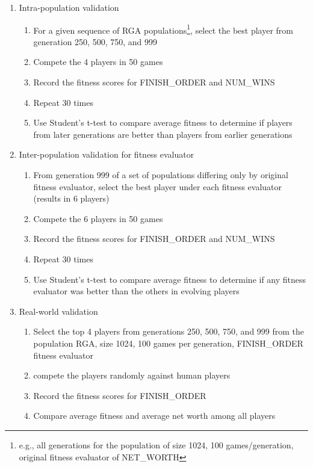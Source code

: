 \begin{enumerate} 
  \item {Intra-population validation}
  \begin{enumerate}
    \item {For a given sequence of RGA populations\footnote{e.g., all
    generations for the population of size 1024, 100 games/generation, original
    fitness evaluator of NET\_WORTH}, select the best player from generation
    250, 500, 750, and 999}
    \item {Compete the 4 players in 50 games}
    \item {Record the fitness scores for FINISH\_ORDER and NUM\_WINS}
    \item {Repeat 30 times}
    \item {Use Student's t-test to compare average fitness to determine if
    players from later generations are better than players from earlier
    generations}
  \end{enumerate}
  \item {Inter-population validation for fitness evaluator}
  \begin{enumerate} 
    \item {From generation 999 of a set of populations differing only by
    original fitness evaluator, select the best player under each fitness
    evaluator (results in 6 players)} 
    \item {Compete the 6 players in 50 games}
    \item {Record the fitness scores for FINISH\_ORDER and NUM\_WINS}
    \item {Repeat 30 times}
    \item {Use Student's t-test to compare average fitness to determine if
    any fitness evaluator was better than the others in evolving players}
  \end {enumerate}
  \item {Real-world validation}
  \begin{enumerate} 
    \item {Select the top 4 players from generations 250, 500, 750, and 999 from
    the population RGA, size 1024, 100 games per generation, FINISH\_ORDER
    fitness evaluator}
    \item {compete the players randomly against human players}
    \item {Record the fitness scores for FINISH\_ORDER}
    \item {Compare average fitness and average net worth among all players}
  \end {enumerate}
\end{enumerate}
